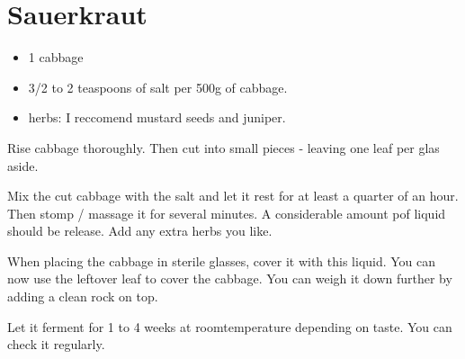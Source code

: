 \section{Sauerkraut}{
\begin{itemize}
        \item 1 cabbage
        \item 3/2 to 2 teaspoons of salt per 500g of cabbage.
        \item herbs: I reccomend mustard seeds and juniper.
\end{itemize}

        Rise cabbage thoroughly. Then cut into small pieces - 
        leaving one leaf per glas aside. 

        Mix the cut cabbage with the salt and let it rest for 
        at least a quarter of an hour. Then stomp / massage it 
        for several minutes. A considerable amount pof liquid 
        should be release. Add any extra herbs you like.

        When placing the cabbage in sterile glasses, cover it with
        this liquid. You can now use the leftover leaf to cover
        the cabbage. You can weigh it down further by adding a 
        clean rock on top.

        Let it ferment for 1 to 4 weeks at roomtemperature 
        depending on taste. You can check it regularly.
        }
